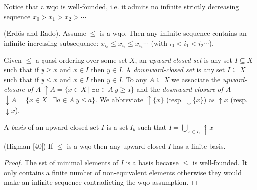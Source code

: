 Notice that a wqo is well-founded, i.e. it admits no infinite strictly decreasing sequence
$x_0 > x_1 > x_2 > \cdots$


\begin{lemma}
(Erd\"os and Rado). Assume $\leq$ is a wqo. Then any infinite sequence contains an infinite increasing subsequence: $x_{i_0} \leq x_{i_1} \leq x_{i_2} \cdots$ (with $i_0 < i_1 < i_2 \cdots$).
\end{lemma}

\iffalse
\begin{proof}
Consider an infinite sequence and the set $M = \{i \in N \mid \forall j > i ~ x_i \not\leq x_j \}$. $M$ cannot
be infinite, otherwise it would lead to an infinite subsequence contradicting the wqo
hypothesis. Thus, $M$ is bounded and any $x_i$ with $i$ beyond $M$ can start an infinite
increasing subsequence.
\end{proof}
\fi


Given $\leq$ a quasi-ordering over some set $X$, an {\em upward-closed set} is any set $I \subseteq X$ such that if $y \geq x$ and $x \in I$ then $y \in I $.
A {\em downward-closed set} is any set $I \subseteq X$ such that if $y \leq x$ and $x \in I$ then $y \in I $. 
To any $A \subseteq X$ we associate
the {\em upward-closure of $A$} 
 $\uparrow A = \{x \in X \mid \exists a \in A ~ y \geq a\}$
 and the 
 {\em downward-closure of $A$} 
 $\downarrow A = \{x \in X \mid \exists a \in A ~ y \leq a\}$. 
We abbreviate $\uparrow \{x\}$ (resp. $\downarrow \{x\}$)
as $\uparrow x$ (resp. $\downarrow x$).


A {\em basis} of an upward-closed set $I$ is a set $I_b$ such that $I = \bigcup_{x \in I_b} \uparrow x$. 


\begin{lemma}{(Higman [40])} 
If $\leq$ is a wqo then any upward-closed $I$ has a
finite basis.
\end{lemma}


\begin{proof}
The set of minimal elements of $I$ is a basis because $\leq$ is well-founded. It
only contains a finite number of non-equivalent elements otherwise they would make
an infinite sequence contradicting the wqo assumption.
\end{proof}



